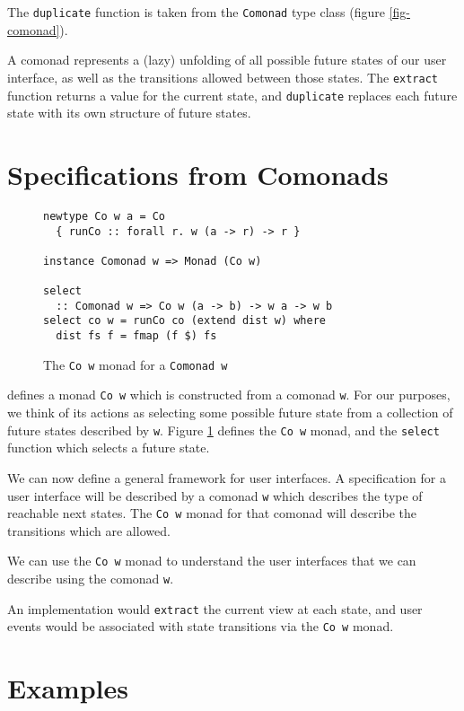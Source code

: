 \documentclass[nocopyrightspace]{sigplanconf}
\begin{document}
The \texttt{duplicate} function is taken from the \texttt{Comonad} type class
(figure \ref{fig-comonad}).

A comonad represents a (lazy) unfolding of all possible future states of our user interface, as well as
the transitions allowed between those states. The \texttt{extract} function returns
a value for the current state, and \texttt{duplicate}
replaces each future state with its own structure of future states.

\section{Specifications from Comonads}

\begin{figure}
\begin{verbatim}
newtype Co w a = Co
  { runCo :: forall r. w (a -> r) -> r }

instance Comonad w => Monad (Co w)

select
  :: Comonad w => Co w (a -> b) -> w a -> w b
select co w = runCo co (extend dist w) where
  dist fs f = fmap (f $) fs
\end{verbatim}
\caption{The \texttt{Co w} monad for a \texttt{Comonad w} \citep{kmett}}
\label{fig-transition}
\end{figure}

\citet{kmett} defines a monad \texttt{Co w} which is
constructed from a comonad \texttt{w}. For our purposes, we
think of its actions as selecting some possible future state from a collection of
future states described by \texttt{w}. Figure \ref{fig-transition} defines the \texttt{Co w} monad, and
the \texttt{select} function which selects a future state.

We can now define a general framework for user interfaces.
A specification for a user interface will be described by a comonad \texttt{w} which describes
the type of reachable next states. The \texttt{Co w} monad for that comonad will
describe the transitions which are allowed.

We can use the \texttt{Co w} monad to understand the user interfaces that we
can describe using the comonad \texttt{w}.

An implementation would \texttt{extract} the current view at each state, and
user events would be associated with state transitions via the \texttt{Co w} monad.

\section{Examples}
\end{document}
